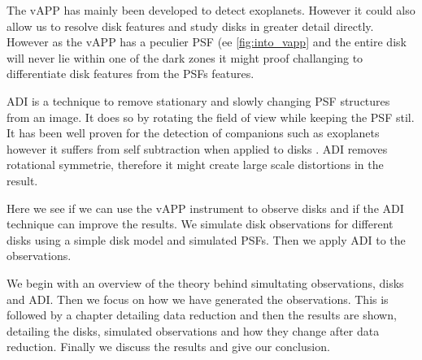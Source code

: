 The \ac{vAPP} has mainly been developed to detect exoplanets. However it could also allow us to resolve disk features and study disks in greater detail directly. However as the \ac{vAPP} has a peculier \ac{PSF} (ee \autoref{fig:into_vapp} and the entire disk will never lie within one of the dark zones it might proof challanging to differentiate disk features from the \acp{PSF} features. 

\ac{ADI} is a technique to remove stationary and slowly changing \ac{PSF} structures from an image. It does so by rotating the field of view while keeping the \ac{PSF} stil. It has been well proven for the detection of companions such as exoplanets however it suffers from self subtraction when applied to disks \cite{self_sub1} \cite{self_sub2}. \ac{ADI} removes rotational symmetrie, therefore it might create large scale distortions in the result.

Here we see if we can use the \ac{vAPP} instrument to observe disks and if the \ac{ADI} technique can improve the results. We simulate disk observations for different disks using a simple disk model and simulated \acp{PSF}. Then we apply \ac{ADI} to the observations.

We begin with an overview of the theory behind simultating observations, disks and \ac{ADI}. Then we focus on how we have generated the observations. This is followed by a chapter detailing data reduction and then the results are shown, detailing the disks, simulated observations and how they change after data reduction. Finally we discuss the results and give our conclusion. 

